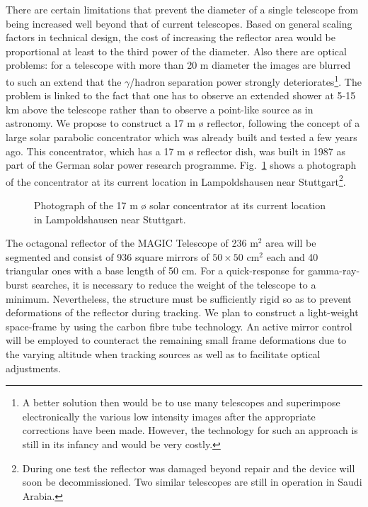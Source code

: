 There are certain limitations that prevent the diameter of a single
telescope from being increased well beyond that of current telescopes. 
Based on general scaling factors in
technical design,  the cost of increasing the reflector area would be
proportional at least to the third power of  the diameter. Also there are
optical problems: for a telescope with more than 20 m diameter the 
images are blurred to such an extend that the $\gamma$/hadron separation
power strongly deteriorates\footnote{%
A better solution then would be to use many telescopes and superimpose
electronically the various low intensity images after the appropriate
corrections have been made. However, the technology for such an approach is
still in its infancy and would be very costly.}. The problem  is linked to
the fact that one has to observe an extended shower at 5-15 km above the
telescope  rather than to observe a point-like source as in astronomy. We
propose to construct a 17 m {\o} reflector, 
following the concept of a large
solar parabolic concentrator which was already built and  tested a few years
ago. This concentrator, which has a 17 m {\o} 
reflector dish, was built in 1987  as part
of the German solar power research programme. Fig.~\ref{fig-solar} shows a
photograph of the concentrator at its current location in Lampolds\-hausen
near Stuttgart\footnote{%
During one test the reflector was damaged beyond repair and the device will
soon be decommissioned. Two similar telescopes are still in operation in
Saudi Arabia.}. 
\begin{figure}[htb]
\leavevmode
\centering
\epsfxsize=14cm
\caption{Photograph of the 17 m {\o}
solar concentrator at its current location in Lampolds\-hausen
near Stuttgart.}
\label{fig-solar}
\end{figure}
The octagonal reflector of the MAGIC Telescope of 236 m$^2$ area will be
segmented and consist of 936 square mirrors of $50 \times 50$ cm$^2$ each and
40 triangular ones with a base length of 50 cm. For a quick-response
for gamma-ray-burst searches, it is necessary to reduce the
weight of the telescope 
to a minimum. Nevertheless, the structure must be sufficiently rigid
so as to prevent deformations of the reflector during tracking. We plan to 
construct a light-weight space-frame by using the carbon
fibre tube technology. 
An active mirror control will be employed to counteract the
remaining small frame deformations due to
the varying altitude when tracking sources as well as to facilitate
optical adjustments.

